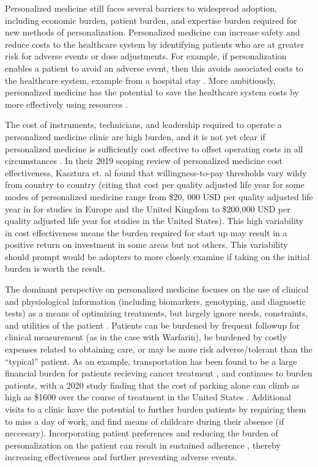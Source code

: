 Personalized medicine still faces several barriers to widespread adoption, including economic burden, patient burden, and expertise burden required for new methods of personalization.
Personalized medicine can increase safety and reduce costs to the healthcare system by identifying patients who are at greater risk for adverse events or dose adjustments.  For example, if personalization enables a patient to avoid an adverse event, then this avoids associated costs to the healthcare system, example from a hospital stay \cite{looff2016economic}.  More ambitiously, personalized medicine has the potential to save the healthcare system costs by more effectively using resources \cite{shabaruddin2015economic}. 

The cost of instruments, technicians, and leadership required to operate a personalized medicine clinic are high burden, and it is not yet clear if personalized medicine is sufficiently cost effective to offset operating costs in all circumstances \cite{kasztura2019cost}.  In their 2019 scoping review of personalized medicine cost effectiveness, Kasztura et. al \cite{kasztura2019cost} found that willingness-to-pay thresholds vary wildy from country to country (citing that cost per quality adjusted life year for some modes of personalized medicine range from \$20, 000 USD per quality adjusted life year in for studies in Europe and the United Kingdom to \$200,000 USD per quality adjusted life year for studies in the United States).  This high variability in cost effectiveness means the burden required for start up may result in a positive return on investment in some areas but not others. This variability should prompt would be adopters to more closely examine if taking on the initial burden is worth the result.

The dominant perspective on personalized medicine focuses on the use of clinical and physiological information (including biomarkers, genotyping, and diagnostic tests) as a means of optimizing treatments, but largely ignore needs, constraints, and utilities of the patient \cite{rogowski2015concepts, di2017personalized}. Patients can be burdened by frequent followup for clinical measurement (as in the case with Warfarin), be burdened by costly expenses related to obtaining care, or may be more risk adverse/tolerant than the ``typical'' patient. As an example, transportation has been found to be a large financial burden for patients recieving cancer treatment \cite{houts1984nonmedical}, and continues to burden patients, with a 2020 study finding that the cost of parking alone can climb as high as \$1600 over the course of treatment in the United States \cite{lee2020assessment}.  Additional visits to a clinic have the potential to further burden patients by requiring them to miss a day of work, and find means of childcare during their absence (if neccesary). Incorporating patient preferences and reducing the burden of personalization on the patient can result in sustained adherence \cite{elliott2008understanding}, thereby increasing effectiveness and further preventing adverse events.

